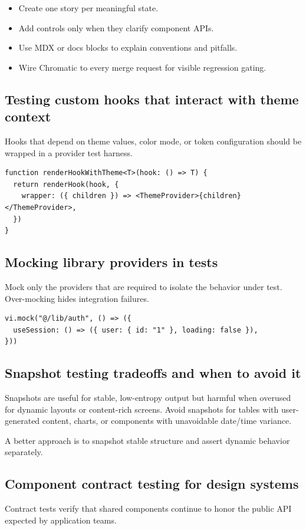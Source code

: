 \begin{itemize}[leftmargin=*, itemsep=0.35em]
  \item Create one story per meaningful state.
  \item Add controls only when they clarify component APIs.
  \item Use MDX or docs blocks to explain conventions and pitfalls.
  \item Wire Chromatic to every merge request for visible regression gating.
\end{itemize}

\subsection{Testing custom hooks that interact with theme context}
Hooks that depend on theme values, color mode, or token configuration should be wrapped in a provider test harness.

\begin{verbatim}
function renderHookWithTheme<T>(hook: () => T) {
  return renderHook(hook, {
    wrapper: ({ children }) => <ThemeProvider>{children}</ThemeProvider>,
  })
}
\end{verbatim}

\subsection{Mocking library providers in tests}
Mock only the providers that are required to isolate the behavior under test. Over-mocking hides integration failures.

\begin{verbatim}
vi.mock("@/lib/auth", () => ({
  useSession: () => ({ user: { id: "1" }, loading: false }),
}))
\end{verbatim}

\subsection{Snapshot testing tradeoffs and when to avoid it}
Snapshots are useful for stable, low-entropy output but harmful when overused for dynamic layouts or content-rich screens. Avoid snapshots for tables with user-generated content, charts, or components with unavoidable date/time variance.

A better approach is to snapshot stable structure and assert dynamic behavior separately.

\subsection{Component contract testing for design systems}
Contract tests verify that shared components continue to honor the public API expected by application teams.

